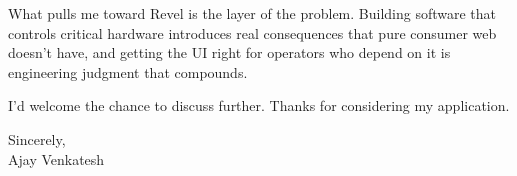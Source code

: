 \documentclass[letterpaper,11pt]{article}
\begin{document}
What pulls me toward Revel is the layer of the problem. Building software that controls critical hardware introduces real consequences that pure consumer web doesn't have, and getting the UI right for operators who depend on it is engineering judgment that compounds.

I'd welcome the chance to discuss further. Thanks for considering my application.

\vspace{12pt}
Sincerely, \\
Ajay Venkatesh
\end{document}
